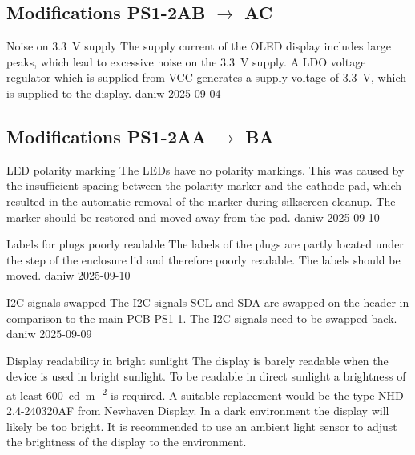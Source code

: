 \FloatBarrier

\subsection{Modifications PS1-2AB $\to$ AC}

\begin{ModTable}

\ModItemDone
{Noise on \qty{3.3}{\volt} supply}
{The supply current of the \ac{OLED} display includes large peaks, which lead to excessive noise on the \qty{3.3}{\volt} supply. }
{A \ac{LDO} voltage regulator which is supplied from VCC generates a supply voltage of \qty{3.3}{\volt}, which is supplied to the display. }
{daniw}
{2025-09-04}

\end{ModTable}

\FloatBarrier

\subsection{Modifications PS1-2AA $\to$ BA}

\begin{ModTable}

\ModItemDone
{LED polarity marking}
{The LEDs have no polarity markings. This was caused by the insufficient spacing between the polarity marker and the cathode pad, which resulted in the automatic removal of the marker during silkscreen cleanup. }
{The marker should be restored and moved away from the pad. }
{daniw}
{2025-09-10}

\ModItemDone
{Labels for plugs poorly readable}
{The labels of the plugs are partly located under the step of the enclosure lid and therefore poorly readable. }
{The labels should be moved. }
{daniw}
{2025-09-10}

\ModItemDone
{\acs{I2C} signals swapped}
{The \ac{I2C} signals SCL and SDA are swapped on the header in comparison to the main PCB PS1-1. }
{The \ac{I2C} signals need to be swapped back. }
{daniw}
{2025-09-09}

\ModItemOpen
{Display readability in bright sunlight}
{The display is barely readable when the device is used in bright sunlight. }
{To be readable in direct sunlight a brightness of at least \qty{600}{\candela\per\square\meter} is required. A suitable replacement would be the type NHD-2.4-240320AF from Newhaven Display. In a dark environment the display will likely be too bright. It is recommended to use an ambient light sensor to adjust the brightness of the display to the environment. }
{}
{}

\end{ModTable}

